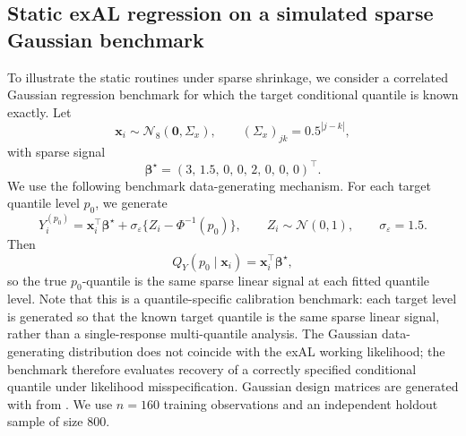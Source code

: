 \documentclass{jss}
\newcommand{\vect}[1]{\boldsymbol{#1}}
\newcommand{\mat}[1]{\mathbf{#1}}
\newcommand{\N}{\mathcal{N}}
\begin{document}

\subsection{Static exAL regression on a simulated sparse Gaussian benchmark}
\label{sec:ex4static}


To illustrate the static routines under sparse shrinkage, we consider a correlated Gaussian regression benchmark for which the target conditional quantile is known exactly. Let
\[
\mat{x}_i \sim \N_8(\mat{0}, \Sigma_x),\qquad (\Sigma_x)_{jk} = 0.5^{|j-k|},
\]
with sparse signal
\[
\vect{\beta}^\star = (3,\,1.5,\,0,\,0,\,2,\,0,\,0,\,0)^\top.
\]
We use the following benchmark data-generating mechanism.
For each target quantile level \(p_0\), we generate
\[
Y_i^{(p_0)} = \mat{x}_i^\top \vect{\beta}^\star + \sigma_\varepsilon \{Z_i - \Phi^{-1}(p_0)\},
\qquad Z_i \sim \N(0,1),\qquad \sigma_\varepsilon = 1.5.
\]
Then
\[
Q_Y(p_0 \mid \mat{x}_i) = \mat{x}_i^\top \vect{\beta}^\star,
\]
so the true \(p_0\)-quantile is the same sparse linear signal at each fitted quantile level. Note that this is a quantile-specific calibration benchmark: each target level is generated so that the known target quantile is the same sparse linear signal, rather than a single-response multi-quantile analysis. The Gaussian data-generating distribution does not coincide with the exAL working likelihood; the benchmark therefore evaluates recovery of a correctly specified conditional quantile under likelihood misspecification. Gaussian design matrices are generated with  from  \citep{MASS}.
We use \(n = 160\) training observations and an independent holdout sample of size \(800\).

\begin{CodeChunk}
\end{CodeChunk}
\end{document}
